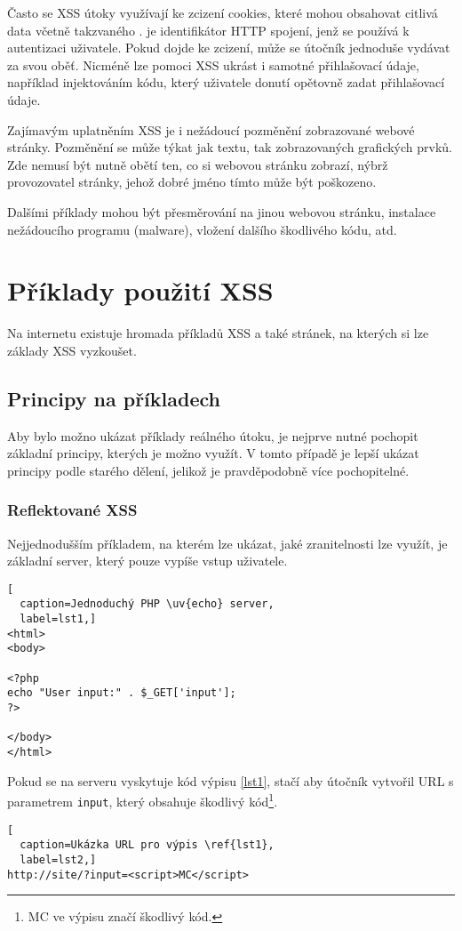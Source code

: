 \documentclass[11pt, conference, a4paper]{IEEEtran}
\begin{document}
Často se XSS útoky využívají ke zcizení cookies, které mohou obsahovat citlivá data včetně takzvaného .  je identifikátor HTTP spojení, jenž se používá k autentizaci uživatele. Pokud dojde ke zcizení, může se útočník jednoduše vydávat za svou oběť. Nicméně lze pomoci XSS ukrást i samotné přihlašovací údaje, například injektováním kódu, který uživatele donutí opětovně zadat přihlašovací údaje. 

Zajímavým uplatněním XSS je i nežádoucí pozměnění zobrazované webové stránky. Pozměnění se může týkat jak textu, tak zobrazovaných grafických prvků. Zde nemusí být nutně obětí ten, co si webovou stránku zobrazí, nýbrž provozovatel stránky, jehož dobré jméno tímto může být poškozeno. 

Dalšími příklady mohou být přesměrování na jinou webovou stránku, instalace nežádoucího programu \mbox{(malware)}, vložení dalšího škodlivého kódu, atd.


\section{Příklady použití XSS}
Na internetu existuje hromada příkladů XSS a také stránek, na kterých si lze základy XSS vyzkoušet. 

\subsection{Principy na příkladech}
Aby bylo možno ukázat příklady reálného útoku, je nejprve nutné pochopit základní principy, kterých je možno využít. V tomto případě je lepší ukázat principy podle starého dělení, jelikož je pravděpodobně více pochopitelné.

\subsubsection{Reflektované XSS}
Nejjednodušším příkladem, na kterém lze ukázat, jaké zranitelnosti lze využít, je základní  server, který pouze vypíše vstup uživatele.

\begin{lstlisting}[
  caption=Jednoduchý PHP \uv{echo} server,
  label=lst1,]
<html>
<body>

<?php
echo "User input:" . $_GET['input'];
?>

</body>
</html>
\end{lstlisting}

Pokud se na serveru vyskytuje kód výpisu \ref{lst1}, stačí aby útočník vytvořil URL s parametrem \texttt{input}, který obsahuje škodlivý kód\footnote{MC ve výpisu značí škodlivý kód.}. 
\begin{lstlisting}[
  caption=Ukázka URL pro výpis \ref{lst1},
  label=lst2,]
http://site/?input=<script>MC</script>
\end{lstlisting}
\end{document}
